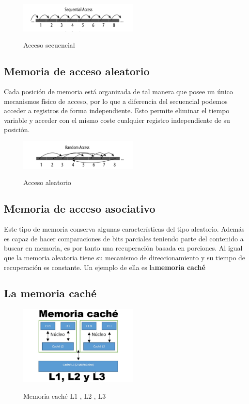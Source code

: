 \documentclass{article}
\begin{document}
    \begin{figure}[h]
    \includegraphics[width=6cm]{images/secuencial.png}
    \centering
    \label{fig:aleatory}
    \caption{Acceso secuencial}
    \end{figure}

\subsection{Memoria de acceso aleatorio} Cada posición de memoria está organizada de tal manera que posee un único mecanismos físico de acceso, por lo que a diferencia del secuencial podemos acceder a registros de forma independiente. Esto permite eliminar el tiempo variable y acceder con el mismo coste cualquier registro independiente de su posición.
 \label{aleatory}
    \begin{figure}[h]
    \includegraphics[width=6cm]{images/aleatorio.png}
    \centering
    \label{fig:aleatory}
    \caption{Acceso aleatorio}
    \end{figure}

\subsection{Memoria de acceso asociativo}
Este tipo de memoria conserva algunas características del tipo aleatorio. Además es capaz de hacer comparaciones de bits parciales teniendo parte del contenido a buscar en memoria, es por tanto una recuperación basada en porciones. Al igual que la memoria aleatoria tiene su mecanismo de direccionamiento y su tiempo de recuperación es constante.
Un ejemplo de ella es la\textbf{memoria caché}

\subsection{La memoria caché}
    \begin{figure}[h]
    \includegraphics[width=6cm]{images/cache.jpg}
    \centering
    \label{fig:aleatory}
    \caption{Memoria caché L1 , L2 , L3}
    \end{figure}
\end{document}
